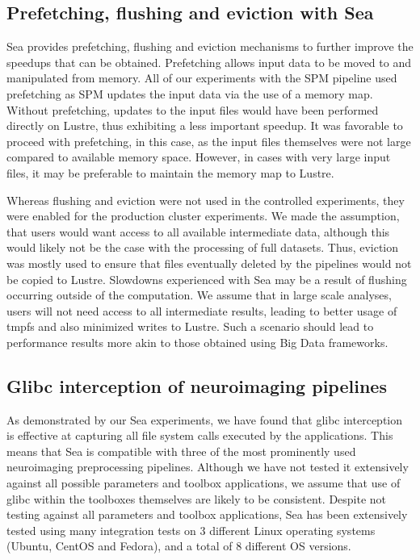 \documentclass[fleqn,10pt]{wlscirep}
\begin{document}
    \subsection{Prefetching, flushing and eviction with Sea}

    Sea provides prefetching, flushing and eviction mechanisms to further
    improve the speedups that can be obtained. Prefetching allows input data to
    be moved to and manipulated from memory. All of our experiments with the SPM pipeline
    used prefetching as SPM updates the input data via the use of a memory map.
    Without prefetching, updates to the input files would have been performed
    directly on Lustre, thus exhibiting a less important speedup. It was
    favorable to proceed with prefetching, in this case, as the input files
    themselves were not large compared to available memory space. However, in
    cases with very large input files, it may be preferable to maintain the
    memory map to Lustre.

    Whereas flushing and eviction were not used in the controlled experiments,
    they were enabled for the production cluster experiments. We made the assumption, that
    users would want access to all available intermediate data, although this
    would likely not be the case with the processing of full datasets. Thus,
    eviction was mostly used to ensure that files eventually deleted by the
    pipelines would not be copied to Lustre. Slowdowns experienced with Sea may
    be a result of flushing occurring outside of the computation. We assume that
    in large scale analyses, users will not need access to all intermediate
    results, leading to better usage of tmpfs and also minimized writes to
    Lustre. Such a scenario should lead to performance results more akin to
    those obtained using Big Data frameworks.

    \subsection{Glibc interception of neuroimaging pipelines}
    
    As demonstrated by our Sea experiments, we have found that glibc interception
    is effective at capturing all file system calls executed by the
    applications. This means that Sea is compatible with three of the most
    prominently used neuroimaging preprocessing pipelines. Although we have not
    tested it extensively against all possible parameters and toolbox
    applications, we assume that use of glibc within the toolboxes themselves are
    likely to be consistent. Despite not testing against all parameters and
    toolbox applications, Sea has been extensively tested using many integration
    tests on 3 different Linux operating systems (Ubuntu, CentOS and Fedora),
    and a total of 8 different OS versions.
\end{document}
